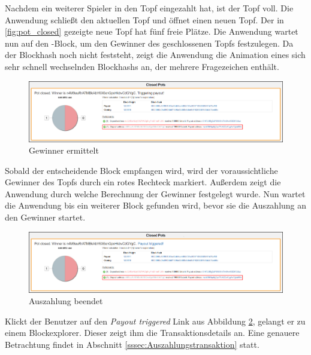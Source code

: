 Nachdem ein weiterer Spieler in den Topf eingezahlt hat, ist der Topf voll. Die Anwendung schließt den aktuellen Topf und öffnet einen neuen Topf. Der in \ref{fig:pot_closed} gezeigte neue Topf hat fünf freie Plätze. Die Anwendung wartet nun auf den -Block, um den Gewinner des geschlossenen Topfs festzulegen. Da der Blockhash noch nicht feststeht, zeigt die Anwendung die Animation eines sich sehr schnell wechselnden Blockhashs an, der mehrere Fragezeichen enthält.

\begin{figure}[H]
\centering
\includegraphics[width=1\linewidth]{Figures/btc_gui/pot_closed_triggering_payout}
\decoRule
\caption{Gewinner ermittelt}
\label{fig:pot_closed_triggering_payout}
\end{figure}
Sobald der entscheidende Block empfangen wird, wird der voraussichtliche Gewinner des Topfs durch ein rotes Rechteck markiert. Außerdem zeigt die Anwendung durch welche Berechnung der Gewinner festgelegt wurde. Nun wartet die Anwendung bis ein weiterer Block gefunden wird, bevor sie die Auszahlung an den Gewinner startet. 

\begin{figure}[H]
\centering
\includegraphics[width=1\linewidth]{Figures/btc_gui/pot_closed_payout_finished}
\decoRule
\caption{Auszahlung beendet}
\label{fig:pot_closed_payout_finished}
\end{figure}

Klickt der Benutzer auf den \emph{Payout triggered} Link aus Abbildung \ref{fig:pot_closed_payout_finished}, gelangt er zu einem Blockexplorer. Dieser zeigt ihm die Transaktionsdetails an. Eine genauere Betrachtung findet in Abschnitt \ref{sssec:Auszahlungstransaktion} statt.